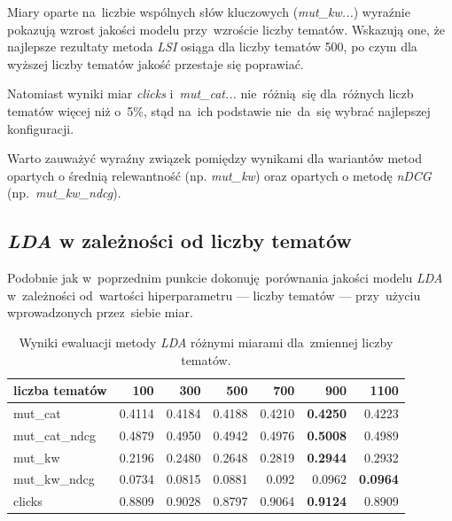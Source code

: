 \documentclass[pl]{minipw} %
\begin{document}
Miary oparte na~liczbie wspólnych słów kluczowych (\textit{mut\_kw...}) wyraźnie pokazują wzrost jakości modelu przy~wzroście liczby tematów. Wskazują one, że najlepsze rezultaty metoda \textit{LSI} osiąga dla liczby tematów 500, po czym dla wyższej liczby tematów jakość przestaje się poprawiać.

Natomiast wyniki miar \textit{clicks} i~\textit{mut\_cat...} nie~różnią~się dla~różnych liczb tematów więcej niż o~5\%, stąd na~ich podstawie nie~da~się wybrać najlepszej konfiguracji.

Warto zauważyć wyraźny związek pomiędzy wynikami dla wariantów metod opartych o średnią relewantność (np. \textit{mut\_kw}) oraz opartych o metodę \textit{nDCG} (np.~\textit{mut\_kw\_ndcg}).

\subsection{\textit{LDA} w zależności od liczby tematów}

Podobnie jak w~poprzednim punkcie dokonuję porównania jakości modelu \textit{LDA} w~zależności od~wartości hiperparametru --- liczby tematów --- przy~użyciu wprowadzonych przez~siebie miar.

\begin{table}[H]
	\centering
	\begin{tabular}{lrrrrrr}
		\hline
		liczba tematów &       100 &       300 &       500 &       700 &       900 &      1100 \\
		\hline
		mut\_cat      & 0.4114 & 0.4184 & 0.4188 & 0.4210  & \textbf{0.4250}  & 0.4223 \\
		mut\_cat\_ndcg & 0.4879 & 0.4950  & 0.4942 & 0.4976 & \textbf{0.5008} & 0.4989 \\
		mut\_kw       & 0.2196 & 0.2480  & 0.2648 & 0.2819 & \textbf{0.2944} & 0.2932 \\
		mut\_kw\_ndcg  & 0.0734 & 0.0815 & 0.0881 & 0.092  & 0.0962 & \textbf{0.0964} \\
		clicks       & 0.8809 & 0.9028 & 0.8797 & 0.9064 & \textbf{0.9124} & 0.8909 \\
		\hline
	\end{tabular}
	\caption{Wyniki ewaluacji metody \textit{LDA} różnymi miarami dla~zmiennej liczby tematów.}
\end{table}
\end{document}
